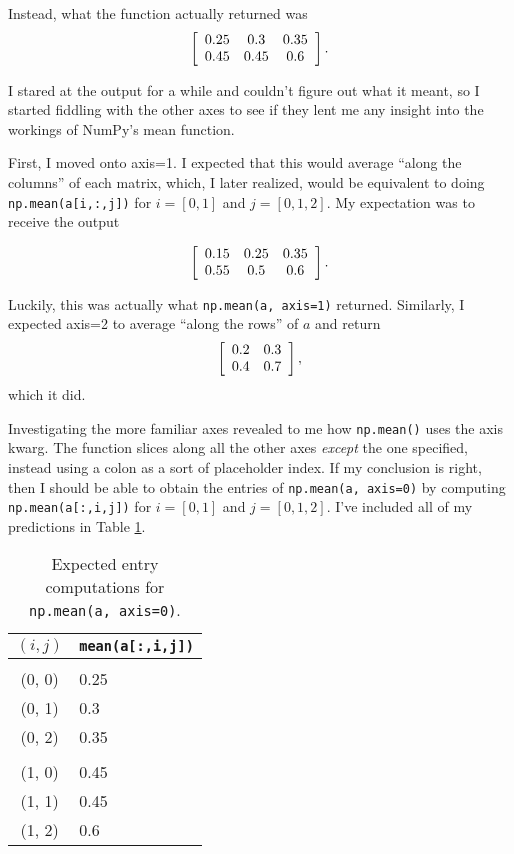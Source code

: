 \documentclass{article}
\begin{document}
Instead, what the function actually returned was
\[\left[
  \begin{array}[c]{ccc}
    0.25 & 0.3 & 0.35 \\
    0.45 & 0.45 & 0.6
  \end{array}
  \label{arr:axis0}
\right].\]



I stared at the output for a while and couldn't figure out what it
meant, so I started fiddling with the other axes to see if they lent
me any insight into the workings of NumPy's mean function.

First, I moved onto axis=1.  I expected that this would average
``along the columns'' of each matrix, which, I later realized, would
be equivalent to doing \verb|np.mean(a[i,:,j])| for $i=[0, 1]$ and
$j=[0, 1, 2]$. My expectation was to receive the output

\[\left[
  \begin{array}[c]{ccc}
    0.15 & 0.25 & 0.35 \\
    0.55 & 0.5 & 0.6
  \end{array}
\right].\]

Luckily, this was actually what \verb|np.mean(a, axis=1)| returned.
Similarly, I expected axis=2 to average ``along the rows'' of $a$ and
return
\[\left[
  \begin{array}[c]{cc}
    0.2 & 0.3 \\
    0.4 & 0.7
  \end{array}
\right],\]
which it did.

Investigating the more familiar axes revealed to me how
\verb|np.mean()| uses the axis kwarg.  The function slices along all
the other axes \emph{except} the one specified, instead using a colon
as a sort of placeholder index.  If my conclusion is right, then I
should be able to obtain the entries of \verb|np.mean(a, axis=0)| by
computing \verb|np.mean(a[:,i,j])| for $i=[0, 1]$ and $j=[0, 1, 2]$.
I've included all of my predictions in Table
\ref{tab:axis0predictions}.

\begin{table}
  \centering
  \begin{tabular}{|c|l|}
    \hline\hline
    $(i,j)$ & \verb|mean(a[:,i,j])| \\
    \hline \\ [-1.5ex]
    (0, 0) & 0.25 \\
    (0, 1) & 0.3 \\
    (0, 2) & 0.35\\ [0.5ex] \hline
    \\ [-1.75ex]
    (1, 0) & 0.45 \\
    (1, 1) & 0.45 \\
    (1, 2) & 0.6 \\ [0.5ex]
    \hline\hline
  \end{tabular}
  \caption{Expected entry computations for \texttt{np.mean(a,
      axis=0)}.}
\label{tab:axis0predictions}
\end{table}
\end{document}
